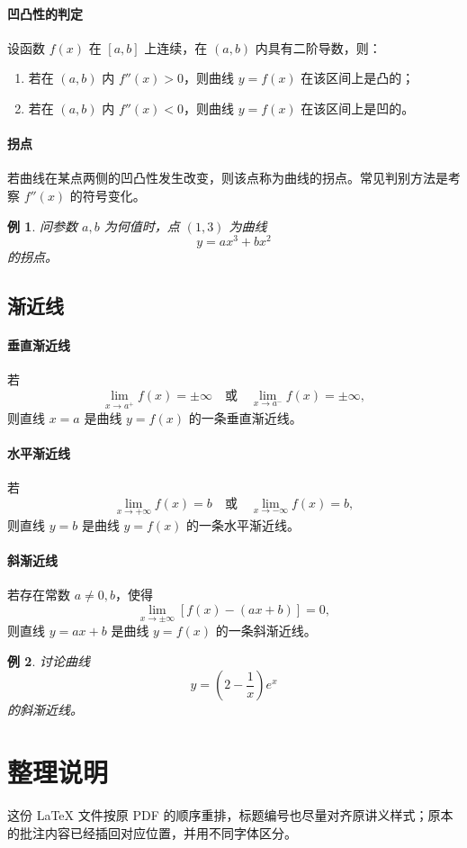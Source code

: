\documentclass[12pt]{ctexart}
\newtheorem{example}{例}[section]
\theoremstyle{definition}
\begin{document}
\paragraph{凹凸性的判定}
设函数 $f(x)$ 在 $[a,b]$ 上连续，在 $(a,b)$ 内具有二阶导数，则：
\begin{enumerate}[label=\arabic*)]
  \item 若在 $(a,b)$ 内 $f''(x)>0$，则曲线 $y=f(x)$ 在该区间上是凸的；
  \item 若在 $(a,b)$ 内 $f''(x)<0$，则曲线 $y=f(x)$ 在该区间上是凹的。
\end{enumerate}

\paragraph{拐点}
若曲线在某点两侧的凹凸性发生改变，则该点称为曲线的拐点。常见判别方法是考察 $f''(x)$ 的符号变化。

\begin{example}
问参数 $a,b$ 为何值时，点 $(1,3)$ 为曲线
\[
y=ax^3+bx^2
\]
的拐点。
\end{example}

\subsection{渐近线}
\paragraph{垂直渐近线}
若
\[
\lim_{x\to a^+}f(x)=\pm\infty
\quad \text{或} \quad
\lim_{x\to a^-}f(x)=\pm\infty,
\]
则直线 $x=a$ 是曲线 $y=f(x)$ 的一条垂直渐近线。

\paragraph{水平渐近线}
若
\[
\lim_{x\to +\infty}f(x)=b
\quad \text{或} \quad
\lim_{x\to -\infty}f(x)=b,
\]
则直线 $y=b$ 是曲线 $y=f(x)$ 的一条水平渐近线。

\paragraph{斜渐近线}
若存在常数 $a\neq 0,b$，使得
\[
\lim_{x\to \pm\infty}[f(x)-(ax+b)]=0,
\]
则直线 $y=ax+b$ 是曲线 $y=f(x)$ 的一条斜渐近线。

\begin{example}
讨论曲线
\[
y=\left(2-\frac{1}{x}\right)e^x
\]
的斜渐近线。
\end{example}

\section{整理说明}
这份 \LaTeX{} 文件按原 PDF 的顺序重排，标题编号也尽量对齐原讲义样式；原本的批注内容已经插回对应位置，并用不同字体区分。
\end{document}
